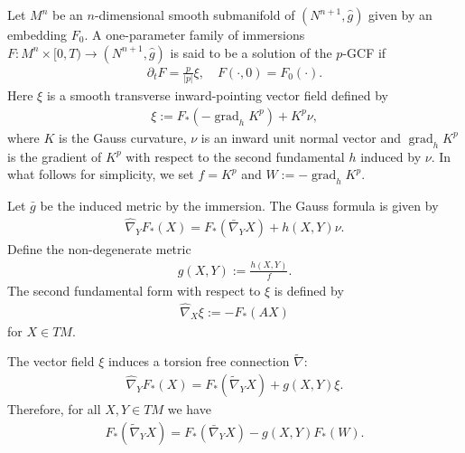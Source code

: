 \documentclass{amsart}
\theoremstyle{definition}
\theoremstyle{remark}
\numberwithin{equation}{section}
\begin{document}
\title[]
 {}

\curraddr{}
\email{}
\date{\today}

\dedicatory{}
\subjclass[2010]{}
\keywords{}

\begin{abstract}

\end{abstract}

\maketitle

Let $M^n$ be an $n$-dimensional smooth submanifold of $(N^{n+1},\hat{g})$ given by an embedding $F_0.$ A one-parameter family of immersions $F\colon M^n\times [0,T)\to (N^{n+1},\hat{g})$ is said to be a solution of the $ p $-GCF if
\begin{align}
\partial_tF=\frac{p}{|p|}\xi,\quad F(\cdot,0)=F_0(\cdot).
\end{align}
Here $\xi $ is a smooth transverse inward-pointing vector field defined by
\begin{align}
\xi:=F_{\ast}(-\operatorname{grad}_hK^p)+ K ^{ p }\nu,
\end{align}
where $ K $ is the Gauss curvature, $\nu$ is an inward unit normal vector and $\operatorname{grad}_hK^{p}$ is the gradient of $K^{p}$ with respect to the second fundamental $h$ induced by $\nu.$ In what follows for simplicity, we set $ f = K ^{ p }$ and $W:=-\operatorname{grad}_hK^{p}.$

Let $\bar{g}$ be the induced metric by the immersion. The Gauss formula is given by
\begin{align}\label{gauss equ}
\hat{\nabla}_YF_{\ast}(X)=F_{\ast}(\bar{\nabla}_YX)+h(X,Y)\nu.
\end{align}
Define the non-degenerate metric
\begin{align}
g(X,Y):=\frac{h(X,Y)}{ f }.
\end{align}
The second fundamental form with respect to $\xi$ is defined by
\begin{align}
\hat{\nabla}_X\xi:=-F_{\ast}(AX)
\end{align}
for $X\in TM$.

The vector field $\xi$ induces a torsion free connection $\tilde{\nabla}$:
\begin{align}\label{gauss equ2}
\hat{\nabla}_YF_{\ast}(X)=F_{\ast}(\tilde{\nabla}_YX)+g(X,Y)\xi.
\end{align}
Therefore, for all $X,Y\in TM$ we have
\begin{align}
F_{\ast}(\tilde{\nabla}_Y X)=F_{\ast}(\bar{\nabla}_YX)-g(X,Y)F_{\ast}(W).
\end{align}
\end{document}
